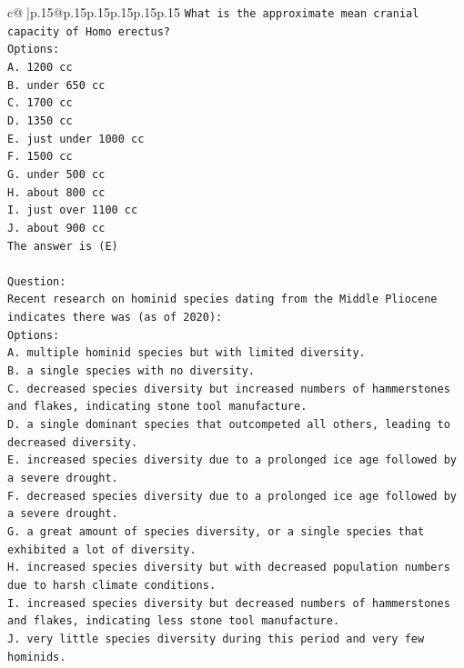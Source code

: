 \documentclass{article}
\begin{document}
{\begin{supertabular}{c@{$\;$}|p{.15\linewidth}@{}p{.15\linewidth}p{.15\linewidth}p{.15\linewidth}p{.15\linewidth}p{.15\linewidth}}
{{{\texttt{What is the approximate mean cranial capacity of Homo erectus?} \\
\texttt{Options:} \\
\texttt{A. 1200 cc} \\
\texttt{B. under 650 cc} \\
\texttt{C. 1700 cc} \\
\texttt{D. 1350 cc} \\
\texttt{E. just under 1000 cc} \\
\texttt{F. 1500 cc} \\
\texttt{G. under 500 cc} \\
\texttt{H. about 800 cc} \\
\texttt{I. just over 1100 cc} \\
\texttt{J. about 900 cc} \\
\texttt{The answer is (E)} \\
\\ 
\texttt{Question:} \\
\texttt{Recent research on hominid species dating from the Middle Pliocene indicates there was (as of 2020):} \\
\texttt{Options:} \\
\texttt{A. multiple hominid species but with limited diversity.} \\
\texttt{B. a single species with no diversity.} \\
\texttt{C. decreased species diversity but increased numbers of hammerstones and flakes, indicating stone tool manufacture.} \\
\texttt{D. a single dominant species that outcompeted all others, leading to decreased diversity.} \\
\texttt{E. increased species diversity due to a prolonged ice age followed by a severe drought.} \\
\texttt{F. decreased species diversity due to a prolonged ice age followed by a severe drought.} \\
\texttt{G. a great amount of species diversity, or a single species that exhibited a lot of diversity.} \\
\texttt{H. increased species diversity but with decreased population numbers due to harsh climate conditions.} \\
\texttt{I. increased species diversity but decreased numbers of hammerstones and flakes, indicating less stone tool manufacture.} \\
\texttt{J. very little species diversity during this period and very few hominids.} \\
}}}
\end{supertabular}}
\end{document}
